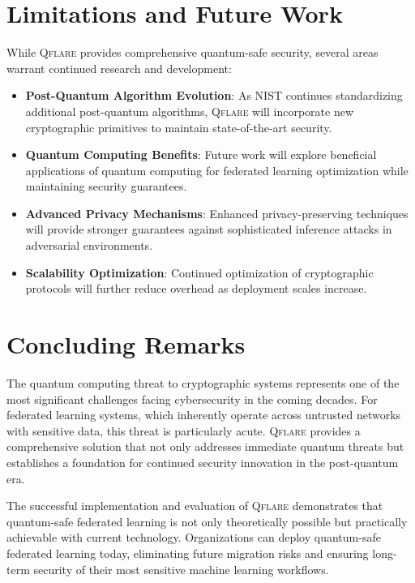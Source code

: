 \documentclass[12pt,a4paper,twoside]{book}
\newcommand{\qflare}{\textsc{Qflare}}
\begin{document}
\section{Limitations and Future Work}
\label{sec:limitations}

While \qflare{} provides comprehensive quantum-safe security, several areas warrant continued research and development:

\begin{itemize}
\item \textbf{Post-Quantum Algorithm Evolution}: As NIST continues standardizing additional post-quantum algorithms, \qflare{} will incorporate new cryptographic primitives to maintain state-of-the-art security.

\item \textbf{Quantum Computing Benefits}: Future work will explore beneficial applications of quantum computing for federated learning optimization while maintaining security guarantees.

\item \textbf{Advanced Privacy Mechanisms}: Enhanced privacy-preserving techniques will provide stronger guarantees against sophisticated inference attacks in adversarial environments.

\item \textbf{Scalability Optimization}: Continued optimization of cryptographic protocols will further reduce overhead as deployment scales increase.
\end{itemize}

\section{Concluding Remarks}
\label{sec:concluding-remarks}

The quantum computing threat to cryptographic systems represents one of the most significant challenges facing cybersecurity in the coming decades. For federated learning systems, which inherently operate across untrusted networks with sensitive data, this threat is particularly acute. \qflare{} provides a comprehensive solution that not only addresses immediate quantum threats but establishes a foundation for continued security innovation in the post-quantum era.

The successful implementation and evaluation of \qflare{} demonstrates that quantum-safe federated learning is not only theoretically possible but practically achievable with current technology. Organizations can deploy quantum-safe federated learning today, eliminating future migration risks and ensuring long-term security of their most sensitive machine learning workflows.
\end{document}
